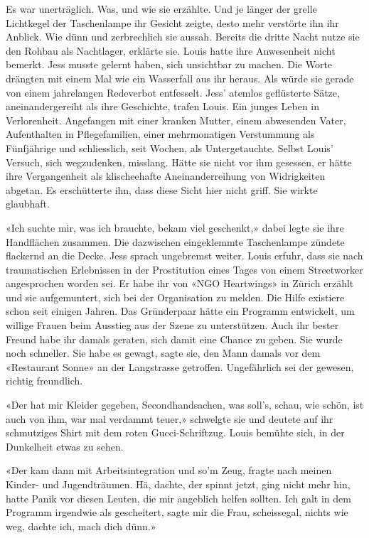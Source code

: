 Es war unerträglich. Was, und wie sie erzählte. Und je länger der grelle Lichtkegel der 
Taschenlampe ihr Gesicht zeigte, desto mehr verstörte ihn ihr Anblick. Wie dünn und zerbrechlich sie
aussah. 
Bereits die dritte Nacht nutze sie den Rohbau als Nachtlager, erklärte sie.
Louis hatte ihre Anwesenheit nicht bemerkt. Jess musste gelernt haben,
sich unsichtbar zu machen. 
Die Worte drängten mit einem Mal wie ein Wasserfall aus ihr heraus. Als
würde sie gerade von einem jahrelangen Redeverbot entfesselt. Jess’
atemlos geflüsterte Sätze, aneinandergereiht als ihre Geschichte, trafen
Louis.
Ein junges Leben in Verlorenheit. Angefangen mit einer kranken Mutter,
einem abwesenden Vater, Aufenthalten in Pflegefamilien, einer
mehrmonatigen Verstummung als Fünfjährige und schliesslich, seit Wochen,
als Untergetauchte. Selbst Louis’ Versuch, sich wegzudenken, misslang.
Hätte sie nicht vor ihm gesessen, er hätte ihre Vergangenheit als
klischeehafte Aneinanderreihung von Widrigkeiten abgetan. Es
erschütterte ihn, dass diese Sicht hier nicht griff. Sie wirkte
glaubhaft.

«Ich suchte mir, was ich brauchte, bekam viel geschenkt,» dabei legte
sie ihre Handflächen zusammen. Die dazwischen eingeklemmte Taschenlampe
zündete flackernd an die Decke. Jess sprach ungebremst weiter.
Louis erfuhr, dass sie nach traumatischen Erlebnissen in der
Prostitution eines Tages von einem Streetworker angesprochen worden sei.
Er habe ihr von «NGO Heartwings» in Zürich erzählt und sie aufgemuntert,
sich bei der Organisation zu melden. Die Hilfe existiere schon seit
einigen Jahren. Das Gründerpaar hätte ein Programm entwickelt, um 
willige Frauen beim Ausstieg aus der Szene zu unterstützen. Auch ihr
bester Freund habe ihr damals geraten, sich damit eine Chance zu geben.
Sie wurde noch schneller. Sie habe es gewagt, sagte sie, den Mann damals vor dem «Restaurant
Sonne» an der Langstrasse getroffen. Ungefährlich sei der gewesen, richtig freundlich.

«Der hat mir Kleider gegeben, Secondhandsachen, was soll’s, schau, wie
schön, ist auch von ihm, war mal verdammt teuer,» schwelgte sie und
deutete auf ihr schmutziges Shirt mit dem roten Gucci-Schriftzug. Louis
bemühte sich, in der Dunkelheit etwas zu sehen.

«Der kam dann mit Arbeitsintegration und so’m Zeug, fragte nach meinen
Kinder- und Jugendträumen. Hä, dachte, der spinnt jetzt, ging nicht mehr
hin, hatte Panik vor diesen Leuten, die mir angeblich helfen sollten.
Ich galt in dem Programm irgendwie als gescheitert, sagte mir die Frau,
scheissegal, nichts wie weg, dachte ich, mach dich dünn.»

